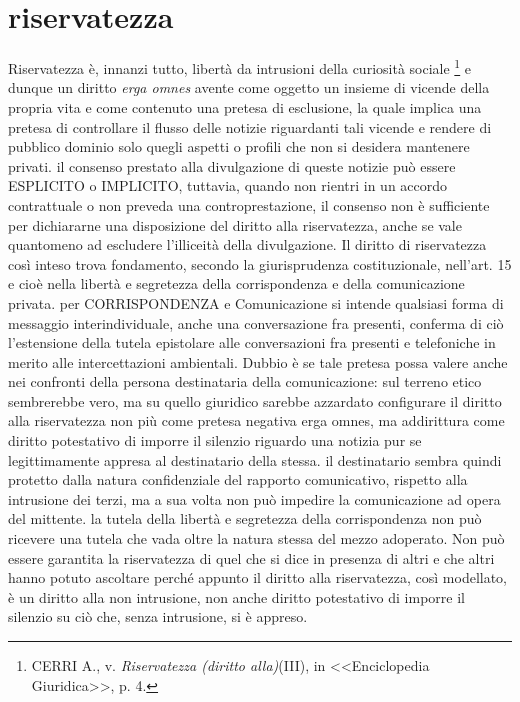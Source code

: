 \section{riservatezza}%
Riservatezza è, innanzi tutto, libertà da intrusioni della curiosità sociale \footnote{CERRI A., v. \textit{Riservatezza (diritto alla)}(III), in <<Enciclopedia Giuridica>>, p. 4.} e dunque un diritto \textit{erga omnes} avente come oggetto un insieme di vicende della propria vita e come contenuto una pretesa di esclusione, la quale implica una pretesa di controllare il flusso delle notizie riguardanti tali vicende e rendere di pubblico dominio solo quegli aspetti  o profili che non si desidera mantenere privati.
il consenso prestato alla divulgazione di queste notizie può essere ESPLICITO o IMPLICITO, tuttavia, quando non rientri in un accordo contrattuale o non preveda una controprestazione, il consenso non è sufficiente per dichiararne una disposizione del diritto alla riservatezza, anche se vale quantomeno ad escludere l'illiceità della divulgazione.
Il diritto di riservatezza così inteso trova fondamento, secondo la giurisprudenza costituzionale, nell'art. 15 e cioè  nella libertà e segretezza della corrispondenza e della comunicazione privata.
per CORRISPONDENZA e Comunicazione si intende qualsiasi forma di messaggio interindividuale, anche una conversazione fra presenti, conferma di ciò l'estensione della tutela epistolare alle conversazioni fra presenti e telefoniche in merito alle intercettazioni ambientali. Dubbio è se tale pretesa possa valere anche nei confronti della persona destinataria della comunicazione: sul terreno etico sembrerebbe vero, ma su quello giuridico sarebbe azzardato configurare il diritto alla riservatezza non più come pretesa negativa erga omnes, ma addirittura come diritto potestativo di imporre il silenzio riguardo una notizia pur se legittimamente appresa al destinatario della stessa. il destinatario sembra quindi protetto dalla natura confidenziale del rapporto comunicativo, rispetto alla intrusione dei terzi, ma a sua volta non può impedire la comunicazione ad opera del mittente. la tutela della libertà e segretezza della corrispondenza non può ricevere una tutela che vada oltre la natura stessa del mezzo adoperato.
Non può essere garantita la riservatezza di quel che si dice in presenza di altri e che altri hanno potuto ascoltare perché appunto il diritto alla riservatezza, così modellato, è un diritto alla non intrusione, non anche diritto potestativo di imporre il silenzio su ciò che, senza intrusione, si è appreso.

